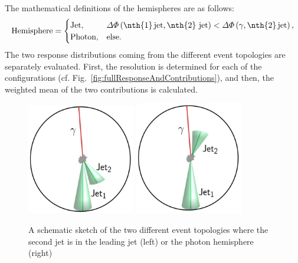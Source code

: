 The mathematical definitions of the hemispheres are as follows:
\begin{equation}\label{eq:HemisphereDefinition}
\text{Hemisphere} = \begin{cases}
  \text{Jet},    & \Delta \Phi \left( \text{\nth{1}\,jet,\,\nth{2} jet} \right) < \Delta \Phi \left( \gamma \text{,\,\nth{2}\,jet} \right) , \\
  \text{Photon}, & \text{else}.\\
\end{cases}
\end{equation}
The two response distributions coming from the different event topologies are separately evaluated. First, the resolution is determined for each of the configurations 
(cf. Fig.~\ref{fig:fullResponseAndContributions}), and then, the weighted mean of the two contributions is calculated.
\begin{figure}[!t]
 \centering
     \includegraphics[width=0.42\textwidth]{figures/resolution/methodology/2ndJet_in_JetHemisphere.pdf}
     \hspace{0.1\textwidth}
     \includegraphics[width=0.42\textwidth]{figures/resolution/methodology/2ndJet_in_PhotonHemisphere.pdf}
  \caption{A schematic sketch of the two different event topologies where the second jet is in the leading jet (left) or the photon hemisphere (right)}  
 \label{fig:sketch}
\end{figure}
